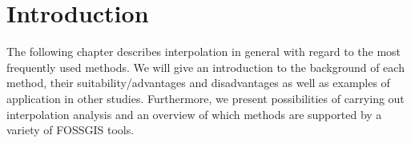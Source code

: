 
\section{Introduction}

The following chapter describes interpolation in general with regard to the most frequently used methods. We will give an introduction to the background of each method, their suitability/advantages and disadvantages as well as examples of application in other studies. Furthermore, we present possibilities of carrying out interpolation analysis and an overview of which methods are supported by a variety of FOSSGIS tools.


\subsection{}